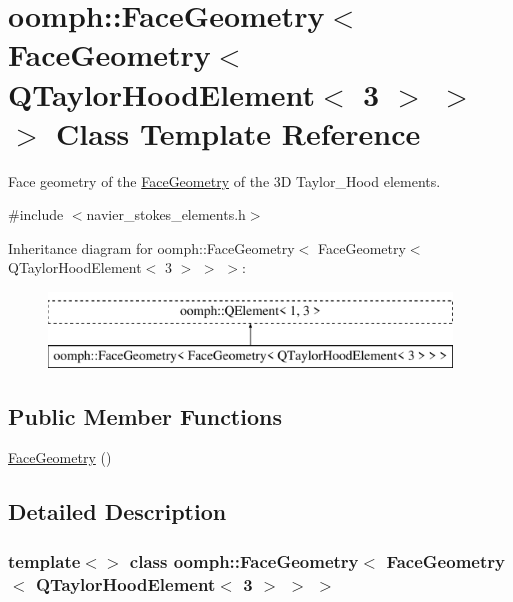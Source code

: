 \hypertarget{classoomph_1_1FaceGeometry_3_01FaceGeometry_3_01QTaylorHoodElement_3_013_01_4_01_4_01_4}{}\section{oomph\+:\+:Face\+Geometry$<$ Face\+Geometry$<$ Q\+Taylor\+Hood\+Element$<$ 3 $>$ $>$ $>$ Class Template Reference}
\label{classoomph_1_1FaceGeometry_3_01FaceGeometry_3_01QTaylorHoodElement_3_013_01_4_01_4_01_4}


Face geometry of the \hyperlink{classoomph_1_1FaceGeometry}{Face\+Geometry} of the 3D Taylor\+\_\+\+Hood elements.  




{\ttfamily \#include $<$navier\+\_\+stokes\+\_\+elements.\+h$>$}

Inheritance diagram for oomph\+:\+:Face\+Geometry$<$ Face\+Geometry$<$ Q\+Taylor\+Hood\+Element$<$ 3 $>$ $>$ $>$\+:\begin{figure}[H]
\begin{center}
\leavevmode
\includegraphics[height=2.000000cm]{classoomph_1_1FaceGeometry_3_01FaceGeometry_3_01QTaylorHoodElement_3_013_01_4_01_4_01_4}
\end{center}
\end{figure}
\subsection*{Public Member Functions}
\begin{DoxyCompactItemize}
\item 
\hyperlink{classoomph_1_1FaceGeometry_3_01FaceGeometry_3_01QTaylorHoodElement_3_013_01_4_01_4_01_4_a4c27dabd8bc9da16e195b1ba5b961981}{Face\+Geometry} ()
\end{DoxyCompactItemize}


\subsection{Detailed Description}
\subsubsection*{template$<$$>$\newline
class oomph\+::\+Face\+Geometry$<$ Face\+Geometry$<$ Q\+Taylor\+Hood\+Element$<$ 3 $>$ $>$ $>$}

